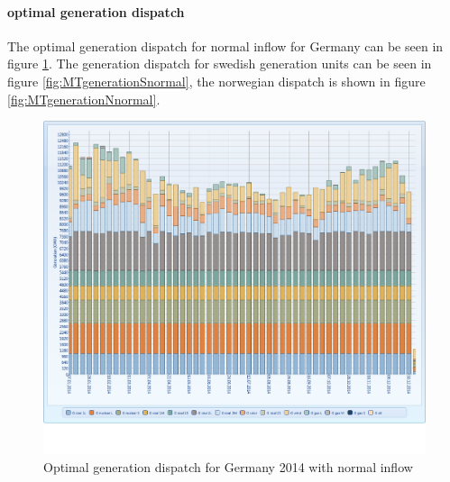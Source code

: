 \documentclass{article}
\begin{document}
\paragraph{optimal generation dispatch\\}
The optimal generation dispatch for normal inflow for Germany can be seen in figure \ref{fig:MTgenerationGnormal}. The generation dispatch for swedish generation units can be seen in figure \ref{fig:MTgenerationSnormal}, the norwegian dispatch is shown in figure \ref{fig:MTgenerationNnormal}.
\begin{figure}[htbp]
\begin{center}
\includegraphics[width=14cm,keepaspectratio=true]{figures/MTgenerationG}
\caption{Optimal generation dispatch for Germany 2014 with normal inflow}
\label{fig:MTgenerationGnormal}
\end{center}
\end{figure}
\end{document}
